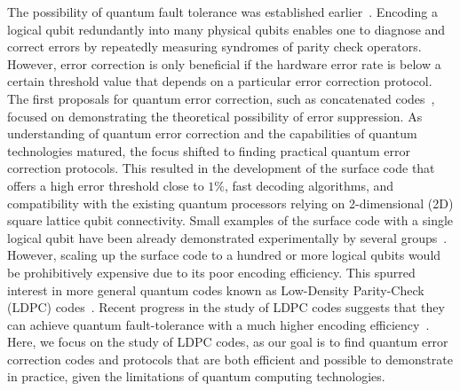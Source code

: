 \documentclass{article}
\begin{document}
The possibility of quantum fault tolerance was established earlier~\cite{shor1995scheme}.  Encoding a logical qubit redundantly into many physical qubits enables one to diagnose and correct errors by repeatedly measuring syndromes of parity check operators.  However, error correction is only beneficial if the hardware  error rate is below a certain threshold value that depends on a particular error correction protocol.  The first proposals for quantum error correction, such as concatenated codes~\cite{aharonov1997fault,kitaev1997quantum,aliferis2005quantum}, focused on demonstrating the theoretical possibility of error suppression. As understanding of quantum error correction and the capabilities of quantum technologies matured, the focus shifted to finding practical quantum error correction protocols. This resulted in the development of the surface code \cite{2003faulkitaevt,bravyi1998quantum,dennis2002topological,fowler2009high} that offers a high error threshold close to $1\%$, fast decoding algorithms, and compatibility with the existing quantum processors relying on 2-dimensional (2D) square lattice qubit connectivity.  Small examples of the surface code with a single logical qubit have been already demonstrated experimentally by several groups~\cite{takita2016demonstration,marques2022logical,krinner2022realizing,zhao2022realization,google2023suppressing}.  However, scaling up the surface code to a hundred or more logical qubits would be prohibitively expensive due to its poor encoding efficiency.  This spurred interest in more general quantum codes known as Low-Density Parity-Check (LDPC) codes~\cite{gottesman2013fault}.  Recent progress in the study of LDPC codes suggests that they can achieve quantum fault-tolerance with a much higher encoding efficiency~\cite{tremblay2022constant}. Here, we focus on the study of LDPC codes, as our goal is to find quantum error correction codes and protocols that are both efficient and possible to demonstrate in practice, given the limitations of quantum computing technologies. 
\end{document}
